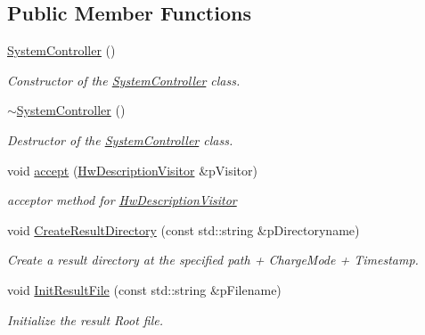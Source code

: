 \subsection*{Public Member Functions}
\begin{CompactItemize}
\item 
\hyperlink{class_ph2___system_1_1_system_controller_7755f0304eb845c975862df469f25e70}{System\-Controller} ()
\begin{CompactList}\small\item\em Constructor of the \hyperlink{class_ph2___system_1_1_system_controller}{System\-Controller} class. \item\end{CompactList}\item 
\hyperlink{class_ph2___system_1_1_system_controller_bd794b0a85d9d83ec553d707875efcf1}{$\sim$System\-Controller} ()
\begin{CompactList}\small\item\em Destructor of the \hyperlink{class_ph2___system_1_1_system_controller}{System\-Controller} class. \item\end{CompactList}\item 
void \hyperlink{class_ph2___system_1_1_system_controller_3cffbcd10fcf3804d78f8a91dfdab39e}{accept} (\hyperlink{class_hw_description_visitor}{Hw\-Description\-Visitor} \&p\-Visitor)
\begin{CompactList}\small\item\em acceptor method for \hyperlink{class_hw_description_visitor}{Hw\-Description\-Visitor} \item\end{CompactList}\item 
void \hyperlink{class_ph2___system_1_1_system_controller_6ad8f5935f511aa28e66364182e6a38d}{Create\-Result\-Directory} (const std::string \&p\-Directoryname)
\begin{CompactList}\small\item\em Create a result directory at the specified path + Charge\-Mode + Timestamp. \item\end{CompactList}\item 
void \hyperlink{class_ph2___system_1_1_system_controller_60c6f410bf7f2cda51256670933e11d0}{Init\-Result\-File} (const std::string \&p\-Filename)
\begin{CompactList}\small\item\em Initialize the result Root file. \item\end{CompactList}\item 

\end{CompactItemize}

